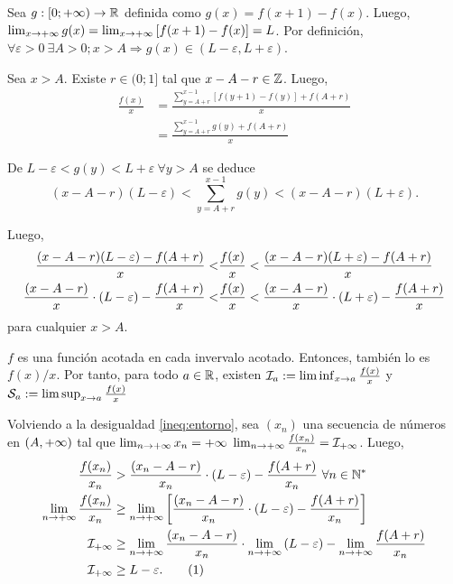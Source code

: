 
{
	\newcommand{\openci}[2]{\left(#1-#2,#1+#2\right)}
	\newcommand{\li}[1]{\mathcal{I}_{#1}}
	\newcommand{\ls}[1]{\mathcal{S}_{#1}}

	\newcommand\numberthis{\addtocounter{equation}{1}\tag{\theequation}}


	Sea $g:[0;+\infty)\to\mathbb{R}$ definida como $g(x)=f(x+1)-f(x)$.
	Luego, $\limite{x}{g(x)} = \limite{x}{\left[f(x+1)-f(x)\right]} = L$.
	Por definición, $\forall\varepsilon>0\ \exists A>0; x>A\Rightarrow g(x)\in\openci{L}{\varepsilon}$.

	Sea $x>A$. Existe $r\in(0;1]$ tal que $x-A-r\in\mathbb{Z}$. Luego,
	\begin{align*}
		\frac{f(x)}{x}
		&= \frac{\sum_{y=A+r}^{x-1}\left[f(y+1)-f(y)\right]+f(A+r)}{x}
		\\
		&= \frac{\sum_{y=A+r}^{x-1}g(y)+f(A+r)}{x}
	\end{align*}

	De $L-\varepsilon<g(y)<L+\varepsilon\ \forall y>A$ se deduce
	$$ (x-A-r)(L-\varepsilon) < \sum_{y=A+r}^{x-1}g(y) < (x-A-r)(L+\varepsilon) .$$

	Luego,
	\begin{align} \label{ineq:entorno}
		\frac{(x-A-r)(L-\varepsilon)-f(A+r)}{x} < &\frac{f(x)}{x} < \frac{(x-A-r)(L+\varepsilon)-f(A+r)}{x} \notag
		\\
		\frac{(x-A-r)}{x}\cdot(L-\varepsilon)-\frac{f(A+r)}{x} < &\frac{f(x)}{x} < \frac{(x-A-r)}{x}\cdot(L+\varepsilon)-\frac{f(A+r)}{x}
	\end{align}
	para cualquier $x>A$.

	$f$ es una función acotada en cada invervalo acotado.
	Entonces, también lo es $f(x)/x$.
	Por tanto, para todo $a\in\mathbb{R}$, existen $\li{a}:=\limiteinferior{x}[a]{\frac{f(x)}{x}}$ y $\ls{a}:=\limitesuperior{x}[a]{\frac{f(x)}{x}}$

	Volviendo a la desigualdad \eqref{ineq:entorno}, sea $(x_n)$ una secuencia de números en $(A,+\infty)$ tal que $\limite{n}{x_n}=\pinf$ $\limite{n}{\frac{f(x_n)}{x_n}}=\li{\pinf}$.
	Luego,
	\begin{align*} \label{ineq:li}
		\frac{f(x_n)}{x_n}
			&> \frac{(x_n-A-r)}{x_n}\cdot(L-\varepsilon)-\frac{f(A+r)}{x_n}
			\ \forall n\in\N
		\\
		\limite{n}{\frac{f(x_n)}{x_n}}
			&\geq \limite{n}{\left[\frac{(x_n-A-r)}{x_n}\cdot(L-\varepsilon)-\frac{f(A+r)}{x_n}\right]}
		\\
		\li{\pinf}
			&\geq \limite{n}{\frac{(x_n-A-r)}{x_n}}\cdot\limite{n}{(L-\varepsilon)}-\limite{n}{\frac{f(A+r)}{x_n}}
		\\
		\li{\pinf}
			&\geq L-\varepsilon .\numberthis
	\end{align*}

}
